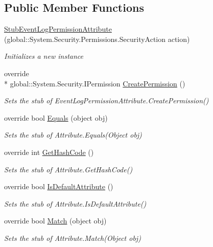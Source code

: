 \subsection*{Public Member Functions}
\begin{DoxyCompactItemize}
\item 
\hyperlink{class_system_1_1_diagnostics_1_1_fakes_1_1_stub_event_log_permission_attribute_af523437035745c63a237ade74f2bb36b}{Stub\-Event\-Log\-Permission\-Attribute} (global\-::\-System.\-Security.\-Permissions.\-Security\-Action action)
\begin{DoxyCompactList}\small\item\em Initializes a new instance\end{DoxyCompactList}\item 
override \\*
global\-::\-System.\-Security.\-I\-Permission \hyperlink{class_system_1_1_diagnostics_1_1_fakes_1_1_stub_event_log_permission_attribute_a0d4b5be411956ca91ad8e3162d06d060}{Create\-Permission} ()
\begin{DoxyCompactList}\small\item\em Sets the stub of Event\-Log\-Permission\-Attribute.\-Create\-Permission()\end{DoxyCompactList}\item 
override bool \hyperlink{class_system_1_1_diagnostics_1_1_fakes_1_1_stub_event_log_permission_attribute_ace4f5cf3b4140f510a0228f5b13aa0c6}{Equals} (object obj)
\begin{DoxyCompactList}\small\item\em Sets the stub of Attribute.\-Equals(\-Object obj)\end{DoxyCompactList}\item 
override int \hyperlink{class_system_1_1_diagnostics_1_1_fakes_1_1_stub_event_log_permission_attribute_a7e26e947b2e61b716e8c2665c7d20980}{Get\-Hash\-Code} ()
\begin{DoxyCompactList}\small\item\em Sets the stub of Attribute.\-Get\-Hash\-Code()\end{DoxyCompactList}\item 
override bool \hyperlink{class_system_1_1_diagnostics_1_1_fakes_1_1_stub_event_log_permission_attribute_a624ee6927aac4c156d1559e5d1ae80da}{Is\-Default\-Attribute} ()
\begin{DoxyCompactList}\small\item\em Sets the stub of Attribute.\-Is\-Default\-Attribute()\end{DoxyCompactList}\item 
override bool \hyperlink{class_system_1_1_diagnostics_1_1_fakes_1_1_stub_event_log_permission_attribute_a86d0e2d2462ced6ffb9e984435ca0c45}{Match} (object obj)
\begin{DoxyCompactList}\small\item\em Sets the stub of Attribute.\-Match(\-Object obj)\end{DoxyCompactList}\end{DoxyCompactItemize}
